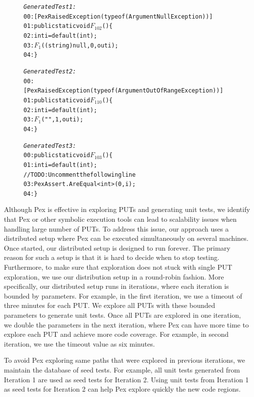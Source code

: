 \begin{figure}[t]
\begin{CodeOut}
\begin{alltt}

\emph{Generated Test 1:}
00: [PexRaisedException(typeof(ArgumentNullException))]
01: public static void $F_102$() \{
02:     int i = default(int); 
03:     $F_1$ ((string)null, 0, out i);
04: \}

\emph{Generated Test 2:}
00: [PexRaisedException(typeof(ArgumentOutOfRangeException))]
01: public static void $F_110$() \{
02:     int i = default(int);
03:     $F_1$("", 1, out i);
04: \}

\emph{Generated Test 3:}
00: public static void $F_103$() \{
01:     int i = default(int);
//TODO: Uncomment the following line
03:     PexAssert.AreEqual<int>(0, i);
04: \}

\end{alltt}
\end{CodeOut}\vspace*{-3ex}
\vspace*{-3ex}
\end{figure}

Although Pex is effective in exploring PUTs and generating unit tests,
we identify that Pex or other symbolic execution tools can lead to scalability issues
when handling large number of PUTs. To address this issue, our approach uses
a distributed setup where Pex can be executed simultaneously on several machines.
Once started, our distributed setup is designed to run forever. The primary reason for such 
a setup is that it is hard to decide when to stop testing. Furthermore, to make sure that
exploration does not stuck with single PUT exploration, we use our distribution 
setup in a round-robin fashion. More specifically, our distributed setup runs
in iterations, where each iteration is bounded by parameters. For example, in the first
iteration, we use a timeout of three minutes for each PUT. We explore all PUTs with these
bounded parameters to generate unit tests. Once all PUTs are explored in one 
iteration, we double the parameters in the next iteration, where Pex can have more 
time to explore each PUT and achieve more code coverage. For example,
in second iteration, we use the timeout value as six minutes. 

To avoid Pex exploring same paths that were explored in previous iterations, we maintain
the database of seed tests. For example, all unit tests generated from Iteration 1 
are used as seed tests for Iteration 2. Using unit tests from Iteration 1 as seed
tests for Iteration 2 can help Pex explore quickly the new code regions.

